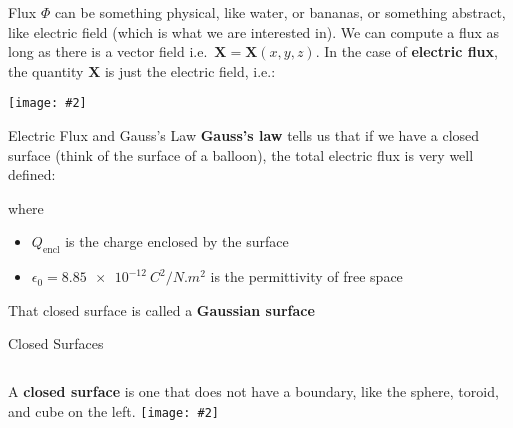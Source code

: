 \documentclass[12pt,aspectratio=169]{beamer}
\newcommand{\pic}[2]{\texttt{[image: \#2]}}
\newcommand{\mb}[1]{\mathbf{#1}}
\newcommand{\eq}[2]{\vspace{#1}{
    \Large\begin{displaymath}#2\end{displaymath}}
}
\begin{document}
\begin{frame}{Flux}
  \vspace{.2in}$\Phi$ can be something physical, like water, or bananas, or
  something abstract, like electric field (which is what we are interested
  in). We can compute a flux as long as there is a vector field i.e.\
  $\mb{X}=\mb{X}(x,y,z)$. In the case of \textbf{electric flux}, the quantity
  $\mb{X}$ is just the
  electric field, i.e.:
    
  \eq{-.2in}{
    \Phi_q=\int\mb{E}\cdot d\mb{A}
  }
  \begin{center}
    \pic{.3}{eflux.png}
  \end{center}
\end{frame}



\begin{frame}{Electric Flux and Gauss's Law}
  \textbf{Gauss's law} tells us that if we have a closed surface (think of
  the surface of a balloon), the total electric flux is very well defined:

  \eq{-.2in}{
    \boxed{
      \Phi_q
      =\oint\mb{E}\cdot d\mb{A}
      =\frac{Q_\mathrm{encl}}{\epsilon_0}
    }
  }
    
  where
  \begin{itemize}
  \item $Q_\mathrm{encl}$ is the charge enclosed by the surface
  \item $\epsilon_0=\SI{8.85e-12}{C^2/N.m^2}$ is the permittivity of free space
  \end{itemize}
  That closed surface is called a \textbf{Gaussian surface}
\end{frame}



\begin{frame}{Closed Surfaces}
  \begin{columns}
    A \textbf{closed surface} is one that does not have a boundary, like the
    sphere, toroid, and cube on the left.
    \pic{1}{800px-SurfacesWithAndWithoutBoundary.png}
  \end{columns}
\end{frame}
\end{document}
